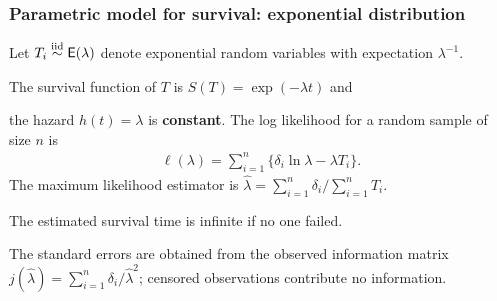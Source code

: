 \documentclass{beamer}
\begin{document}
\begin{frame}
\frametitle{Parametric model for survival: exponential distribution}
Let  $T_i \stackrel{\textnormal{iid}}{\sim} \mathsf{E}(\lambda)$ denote exponential random variables with expectation $\lambda^{-1}$.
\bi \item 
The survival function of  $T$ is $S(T) = \exp(-\lambda t)$ and
\item the hazard $h(t)=\lambda$ is \textbf{constant}.
\ei
The log likelihood for a random sample of size $n$ is
\begin{align*}
\ell(\lambda) =\sum_{i=1}^n \{\delta_i \ln \lambda - \lambda T_i\}.
\end{align*}
The maximum likelihood estimator is $\widehat{\lambda} =\sum_{i=1}^n \delta_i/ \sum_{i=1}^n T_i $. 

\bi \item The estimated survival time is infinite if no one failed.
\item The standard errors are obtained from the observed information matrix $j(\widehat{\lambda}) = \sum_{i=1}^n \delta_i/\widehat{\lambda}^2$; censored observations contribute no information.
\ei

\end{frame}
\end{document}
